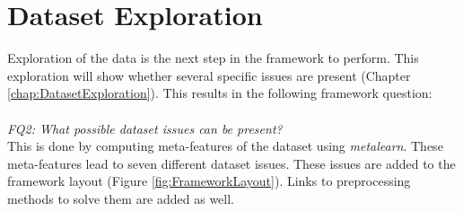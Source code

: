 \documentclass[10pt,a4paper]{report}
\begin{document}
	\section{Dataset Exploration}
	\label{FIsec:ExplorationResults}
	
	Exploration of the data is the next step in the framework to perform. This exploration will show whether several specific issues are present (Chapter \ref{chap:DatasetExploration}). This results in the following framework question: \\
	\\
	\emph{FQ2: What possible dataset issues can be present?} \\
	
	This is done by computing meta-features of the dataset using \textit{metalearn}. These meta-features lead to seven different dataset issues. These issues are added to the framework layout (Figure \ref{fig:FrameworkLayout}). Links to preprocessing methods to solve them are added as well.
	
\end{document}
